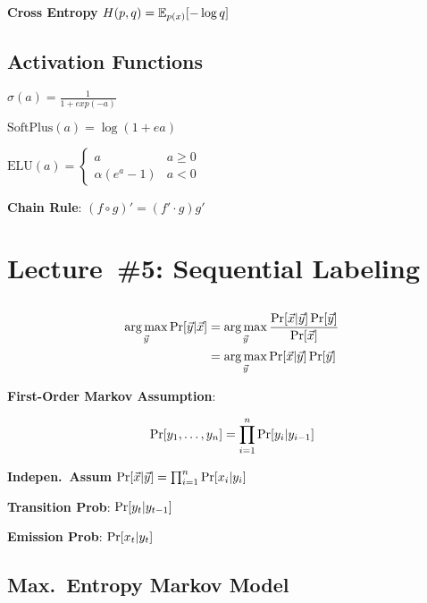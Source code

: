 \documentclass[9pt]{extarticle}
\renewcommand{\green}[1]{{\color{ForestGreen} #1}}
\begin{document}
\begin{multicols}{3}
  \textbf{\green{Cross Entropy}} $H(p,q) = \mathbb{E}_{p(x)} \lbrack-\log q\rbrack$

  \subsection*{Activation Functions}

  $\sigma(a) = \frac{1}{1+exp(-a)}$

  $\text{SoftPlus}(a) = \log(1 + e{a})$

  $\text{ELU}(a) = \begin{cases}
                      a & a \geq 0 \\
                      \alpha (e^{a} - 1) & a < 0
                   \end{cases}$

  \textbf{\green{Chain Rule}}: $(f \circ g)' = (f' \cdot g)g'$

  \section*{Lecture~\#5: Sequential Labeling}
  \subsection*{}

  \begin{align*}
    \operatorname*{arg\,max}_{\vec{y}} \Pr\lbrack\vec{y} \vert \vec{x}\rbrack &= \operatorname*{arg\,max}_{\vec{y}} \frac{\Pr\lbrack\vec{x} \vert \vec{y}\rbrack\Pr[\vec{y}]}{\Pr[\vec{x}]} \\
                                                        &= \operatorname*{arg\,max}_{\vec{y}} \Pr\lbrack\vec{x} \vert \vec{y}\rbrack \Pr[\vec{y}]
  \end{align*}

  \textbf{\green{First-Order Markov Assumption}}:

  \begin{equation*}
    \Pr\lbrack y_{1},\ldots,y_{n}\rbrack = \prod_{i=1}^{n} \Pr[y_{i} \vert y_{i-1}]
  \end{equation*}

  \textbf{\green{Indepen.\ Assum}} $\Pr\lbrack\vec{x} \vert \vec{y}\rbrack = \prod_{i=1}^{n} \Pr[x_{i} \vert y_{i}]$

  \textbf{\green{Transition Prob}}: $\Pr\lbrack y_{t} \vert y_{t-1}\rbrack$

  \textbf{\green{Emission Prob}}: $\Pr\lbrack x_{t} \vert y_{t}\rbrack$

  \subsection*{Max.\ Entropy Markov Model}

\end{multicols}
\end{document}
